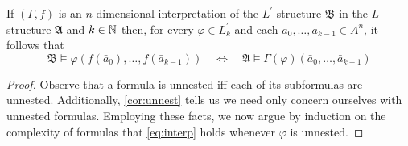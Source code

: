 \begin{prp}\label{prp:strint}
	If $(\Gamma,f)$ is an $n$-dimensional interpretation of the $L^\prime$-structure $\mathfrak{B}$ in the $L$-structure $\mathfrak{A}$ and $k\in\mathbb{N}$ then, for every $\varphi\in L^\prime_k$ and each $\bar{a}_0,\dotsc,\bar{a}_{k-1}\in A^n$, it follows that
	\begin{equation}
		\mathfrak{B}\models\varphi(f(\bar{a}_0),\dotsc,f(\bar{a}_{k-1}))\quad\iff\quad\mathfrak{A}\models\Gamma(\varphi)(\bar{a}_0,\dotsc,\bar{a}_{k-1})\label{eq:interp}
	\end{equation}
\end{prp}
\begin{proof}
	Observe that a formula is unnested iff each of its subformulas are unnested.  Additionally, \ref{cor:unnest} tells us we need only concern ourselves with unnested formulas.  Employing these facts, we now argue by induction on the complexity of formulas that \ref{eq:interp} holds whenever $\varphi$ is unnested.


\end{proof}
